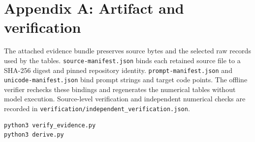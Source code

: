 \documentclass[11pt,letterpaper]{article}
\begin{document}
\clearpage\section*{Appendix A: Artifact and verification}
The attached evidence bundle preserves source bytes and the selected raw records used by the tables. \texttt{source-manifest.json} binds each retained source file to a SHA-256 digest and pinned repository identity. \texttt{prompt-manifest.json} and \texttt{unicode-manifest.json} bind prompt strings and target code points. The offline verifier rechecks these bindings and regenerates the numerical tables without model execution. Source-level verification and independent numerical checks are recorded in \texttt{verification/independent\_verification.json}.

\begin{verbatim}
python3 verify_evidence.py
python3 derive.py
\end{verbatim}
\end{document}
